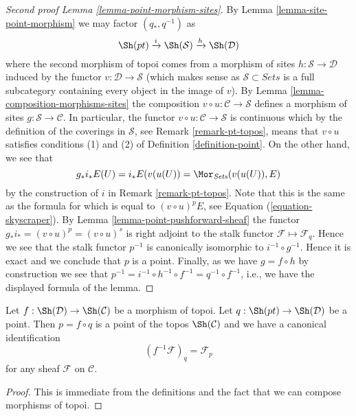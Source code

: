 \begin{proof}[Second proof Lemma \ref{lemma-point-morphism-sites}]
By
Lemma \ref{lemma-site-point-morphism}
we may factor $(q_*, q^{-1})$ as
$$
\Sh(pt) \xrightarrow{i} \Sh(\mathcal{S})
\xrightarrow{h} \Sh(\mathcal{D})
$$
where the second morphism of topoi comes from a morphism of sites
$h : \mathcal{S} \to \mathcal{D}$ induced by the functor
$v : \mathcal{D} \to \mathcal{S}$ (which makes sense as
$\mathcal{S} \subset \textit{Sets}$ is a full subcategory containing
every object in the image of $v$). By
Lemma \ref{lemma-composition-morphisms-sites}
the composition $v \circ u : \mathcal{C} \to \mathcal{S}$
defines a morphism of sites $g : \mathcal{S} \to \mathcal{C}$.
In particular, the functor
$v \circ u : \mathcal{C} \to \mathcal{S}$
is continuous which by the definition of the coverings
in $\mathcal{S}$, see
Remark \ref{remark-pt-topos},
means that $v \circ u$ satisfies conditions (1) and (2) of
Definition \ref{definition-point}.
On the other hand, we see that
$$
g_*i_*E(U) = i_*E(v(u(U)) = \Mor_{\textit{Sets}}(v(u(U)), E)
$$
by the construction of $i$ in
Remark \ref{remark-pt-topos}.
Note that this is the same as the formula for
which is equal to $(v \circ u)^pE$, see
Equation (\ref{equation-skyscraper}).
By
Lemma \ref{lemma-point-pushforward-sheaf}
the functor $g_*i_* = (v \circ u)^p = (v \circ u)^s$
is right adjoint to the stalk functor
$\mathcal{F} \mapsto \mathcal{F}_q$.
Hence we see that the stalk functor $p^{-1}$ is canonically
isomorphic to $i^{-1} \circ g^{-1}$. Hence it is exact and
we conclude that $p$ is a point. Finally, as we have
$g = f \circ h$ by construction we see that
$p^{-1} = i^{-1} \circ h^{-1} \circ f^{-1} = q^{-1} \circ f^{-1}$,
i.e., we have the displayed formula of the lemma.
\end{proof}

\begin{lemma}
\label{lemma-point-morphism-topoi}
Let $f : \Sh(\mathcal{D}) \to \Sh(\mathcal{C})$
be a morphism of topoi. Let $q : \Sh(pt) \to \Sh(\mathcal{D})$
be a point. Then $p = f \circ q$ is a point of the topos
$\Sh(\mathcal{C})$ and we have
a canonical identification
$$
(f^{-1}\mathcal{F})_q = \mathcal{F}_p
$$
for any sheaf $\mathcal{F}$ on $\mathcal{C}$.
\end{lemma}

\begin{proof}
This is immediate from the definitions and the fact that we can
compose morphisms of topoi.
\end{proof}





